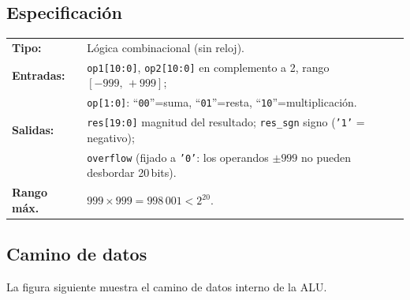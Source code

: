 \documentclass[memoria_final]{subfiles}
\begin{document}
\subsection{Especificación}

\begin{tcolorbox}[colback=SoftGreen,colframe=MainGreen,boxrule=0.8pt,arc=2pt,
  left=0.5cm,right=0.5cm,top=0.3cm,bottom=0.3cm]
  \small
  \begin{tabular}{ll}
    \textbf{Tipo:}      & Lógica combinacional (sin reloj).\\[3pt]
    \textbf{Entradas:}  &
      \texttt{op1[10:0]}, \texttt{op2[10:0]} en complemento a 2,
      rango $[-999,\,+999]$;\\
    & \texttt{op[1:0]}: ``\texttt{00}''=suma, ``\texttt{01}''=resta,
      ``\texttt{10}''=multiplicación.\\[3pt]
    \textbf{Salidas:}   &
      \texttt{res[19:0]} magnitud del resultado;
      \texttt{res\_sgn} signo (\texttt{'1'} = negativo);\\
    & \texttt{overflow} (fijado a \texttt{'0'}: los operandos $\pm999$
      no pueden desbordar 20\,bits).\\[3pt]
    \textbf{Rango máx.} & $999\times999 = 998\,001 < 2^{20}$.
  \end{tabular}
\end{tcolorbox}

\subsection{Camino de datos}

La figura siguiente muestra el camino de datos interno de la ALU.
\end{document}
